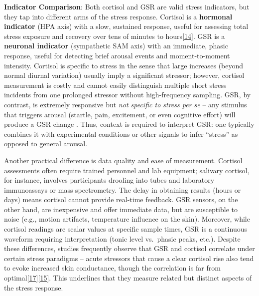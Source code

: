 \documentclass[12pt,a4paper]{article}
\begin{document}
\textbf{Indicator Comparison}: Both cortisol and GSR are valid stress indicators, but they tap into different arms of the stress response. Cortisol is a \textbf{hormonal indicator} (HPA axis) with a slow, sustained response, useful for assessing total stress exposure and recovery over tens of minutes to hours\href{https://www.frontiersin.org/journals/computer-science/articles/10.3389/fcomp.2020.00039/full\#:~:text=The\%20salivary\%20cortisol\%20response\%20\%28e,is\%20a\%20decay\%20time\%20constant}{{[}14{]}}. GSR is a \textbf{neuronal indicator} (sympathetic SAM axis) with an immediate, phasic response, useful for detecting brief arousal events and moment-to-moment intensity. Cortisol is specific to stress in the sense that large increases (beyond normal diurnal variation) usually imply a significant stressor; however, cortisol measurement is costly and cannot easily distinguish multiple short stress incidents from one prolonged stressor without high-frequency sampling. GSR, by contrast, is extremely responsive but \emph{not specific to stress per se} -- any stimulus that triggers arousal (startle, pain, excitement, or even cognitive effort) will produce a GSR change \citep{Boucsein2012}. Thus, context is required to interpret GSR: one typically combines it with experimental conditions or other signals to infer ``stress'' as opposed to general arousal.

Another practical difference is data quality and ease of measurement. Cortisol assessments often require trained personnel and lab equipment; salivary cortisol, for instance, involves participants drooling into tubes and laboratory immunoassays or mass spectrometry. The delay in obtaining results (hours or days) means cortisol cannot provide real-time feedback. GSR sensors, on the other hand, are inexpensive and offer immediate data, but are susceptible to noise (e.g., motion artifacts, temperature influence on the skin). Moreover, while cortisol readings are scalar values at specific sample times, GSR is a continuous waveform requiring interpretation (tonic level vs.~phasic peaks, etc.). Despite these differences, studies frequently observe that GSR and cortisol correlate under certain stress paradigms -- acute stressors that cause a clear cortisol rise also tend to evoke increased skin conductance, though the correlation is far from optimal\href{https://pubmed.ncbi.nlm.nih.gov/37514696/\#:~:text=regions\%20with\%20the\%20ANS\%20correlates,signals\%20significantly\%20varies\%20with\%20gender}{{[}17{]}}\href{https://www.frontiersin.org/journals/computer-science/articles/10.3389/fcomp.2020.00039/full\#:~:text=Since\%20psychological\%20stress\%20results\%20in,Poh\%20et}{{[}15{]}}. This underlines that they measure related but distinct aspects of the stress response.
\end{document}
